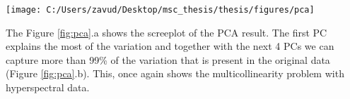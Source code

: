\documentclass[a4paper, twoside]{templates/ociamthesis}
\let\origfigure\figure
\let\endorigfigure\endfigure
\renewenvironment{figure}[1][2] {
    \expandafter\origfigure\expandafter[H]
} {
    \endorigfigure
}
\begin{document}
\begin{figure}
\texttt{[image: C:/Users/zavud/Desktop/msc\_thesis/thesis/figures/pca]} \caption{Principal Component Analysis: a) Screeplot, b) Cumulative variance explained by the first 5 PCs}\label{fig:pca}
\end{figure}

The Figure \ref{fig:pca}.a shows the screeplot of the PCA result. The first PC explains the most of the variation and together with the next 4 PCs we can capture more than 99\% of the variation that is present in the original data (Figure \ref{fig:pca}.b). This, once again shows the multicollinearity problem with hyperspectral data.






\end{document}
